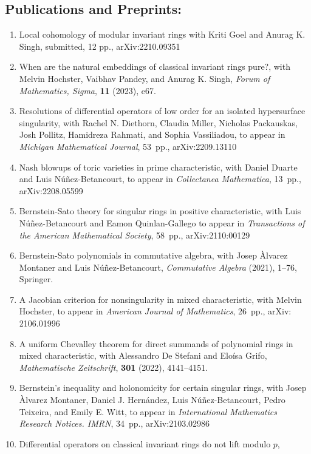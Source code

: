 \documentclass[11pt]{amsart}
\begin{document}
\subsection*{Publications and Preprints:}
{\small
\begin{enumerate}[leftmargin=9mm]
\item Local cohomology of modular invariant rings
with Kriti Goel and Anurag K. Singh,
submitted, 12 pp., arXiv:2210.09351
\item When are the natural embeddings of classical invariant rings pure?,
with Melvin Hochster, Vaibhav Pandey, and Anurag K. Singh,
\emph{Forum of Mathematics, Sigma}, \textbf{11} (2023), e67.
\item Resolutions of differential operators of low order for an isolated hypersurface singularity,
with Rachel N. Diethorn, Claudia Miller, Nicholas Packauskas, Josh Pollitz, Hamidreza Rahmati, and Sophia Vassiliadou,
to appear in \emph{Michigan Mathematical Journal}, 53~pp., arXiv:2209.13110
\item Nash blowups of toric varieties in prime characteristic, 
with Daniel Duarte and Luis Núñez-Betancourt,
to appear in \emph{Collectanea Mathematica}, 13~pp., arXiv:2208.05599
\item Bernstein-Sato theory for singular rings in positive characteristic, 
with Luis Núñez-Betancourt and Eamon Quinlan-Gallego 
to appear in \emph{Transactions of the American Mathematical Society}, 58~pp., arXiv:2110:00129
\item Bernstein-Sato polynomials in commutative algebra, 
with Josep \`Alvarez Montaner and Luis N\'u\~nez-Betancourt,
\emph{Commutative Algebra} (2021), 1--76, Springer.
\item A Jacobian criterion for nonsingularity in mixed characteristic, 
with Melvin Hochster,
to appear in \emph{American Journal of Mathematics}, 26~pp., arXiv: 2106.01996
\item A uniform Chevalley theorem for direct summands of polynomial rings in mixed characteristic, 
with Alessandro De Stefani and Elo\'isa Grifo,
\emph{Mathematische Zeitschrift}, \textbf{301} (2022), 4141--4151.
	\item Bernstein's inequality and holonomicity for certain singular rings,
	with Josep Àlvarez Montaner, Daniel J. Hernández, Luis Núñez-Betancourt, Pedro Teixeira, and Emily E. Witt,
to appear in \emph{International Mathematics Research Notices. IMRN}, 34~pp., arXiv:2103.02986
	\item Differential operators on classical invariant rings do not lift modulo $p$,

\end{enumerate}}
\end{document}
